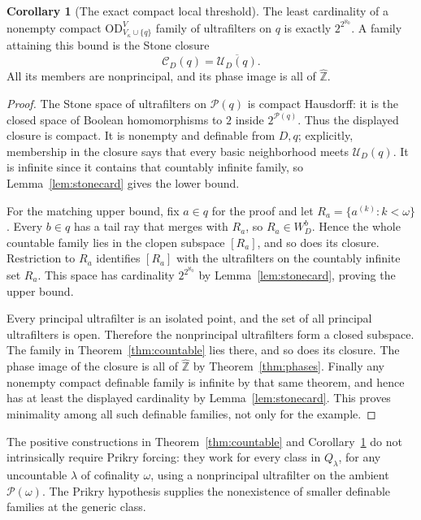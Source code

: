\documentclass[11pt,letterpaper]{article}
\theoremstyle{definition}
\newtheorem{corollary}[definition]{Corollary}
\numberwithin{equation}{section}
\newcommand{\OD}{\mathrm{OD}}
\newcommand{\zhat}{\widehat{\mathbb Z}}
\newcommand{\ODlow}{\OD_{V_\kappa\cup\{q\}}^{V}}
\newcommand{\powerset}{\mathcal P}
\begin{document}
\begin{corollary}[The exact compact local threshold]\label{cor:compactsharp}
The least cardinality of a nonempty compact $\ODlow$ family of
ultrafilters on $q$ is exactly $2^{2^{\aleph_0}}$. A family attaining
this bound is the Stone closure
\[
 \mathcal C_D(q)=\overline{\mathcal U_D(q)}.
\]
All its members are nonprincipal, and its phase image is all of $\zhat$.
\end{corollary}

\begin{proof}
The Stone space of ultrafilters on $\powerset(q)$ is compact Hausdorff:
it is the closed space of Boolean homomorphisms to $2$ inside
$2^{\powerset(q)}$. Thus the displayed closure is compact. It is
nonempty and definable from $D,q$; explicitly, membership in the closure
says that every basic neighborhood meets $\mathcal U_D(q)$.
It is infinite since it contains that countably infinite family, so
Lemma~\ref{lem:stonecard} gives the lower bound.

For the matching upper bound, fix $a\in q$ for the proof and let
$R_a=\{a^{(k)}:k<\omega\}$. Every $b\in q$ has a tail ray that
merges with $R_a$, so $R_a\in W_D^b$. Hence the whole countable family
lies in the clopen subspace $[R_a]$, and so does its closure.
Restriction to $R_a$ identifies $[R_a]$ with the ultrafilters on the
countably infinite set $R_a$. This space has cardinality
$2^{2^{\aleph_0}}$ by Lemma~\ref{lem:stonecard}, proving the upper bound.

Every principal ultrafilter is an isolated point, and the set of all
principal ultrafilters is open. Therefore the nonprincipal ultrafilters
form a closed subspace. The family in Theorem~\ref{thm:countable} lies
there, and so does its closure. The phase image of the closure is all
of $\zhat$ by Theorem~\ref{thm:phases}. Finally any nonempty compact
definable family is infinite by that same theorem, and hence has at least
the displayed cardinality by Lemma~\ref{lem:stonecard}. This proves
minimality among all such definable families, not only for the example.
\end{proof}

The positive constructions in Theorem~\ref{thm:countable} and
Corollary~\ref{cor:compactsharp} do not intrinsically require Prikry
forcing: they work for every class in $Q_\lambda$, for any uncountable
$\lambda$ of cofinality $\omega$, using a nonprincipal ultrafilter on the
ambient $\powerset(\omega)$. The Prikry hypothesis supplies the
nonexistence of smaller definable families at the generic class.
\end{document}

